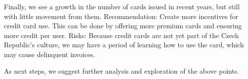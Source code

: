 \documentclass[]{book}
\begin{document}
Finally, we see a growth in the number of cards issued in recent years,
but still with little movement from them. Recommendation: Create more
incentives for credit card use. This can be done by offering more
premium cards and ensuring more credit per user. Risks: Because credit
cards are not yet part of the Czech Republic's culture, we may have a
period of learning how to use the card, which may cause delinquent
invoices.

As next steps, we suggest further analysis and exploration of the above
points.
\end{document}

